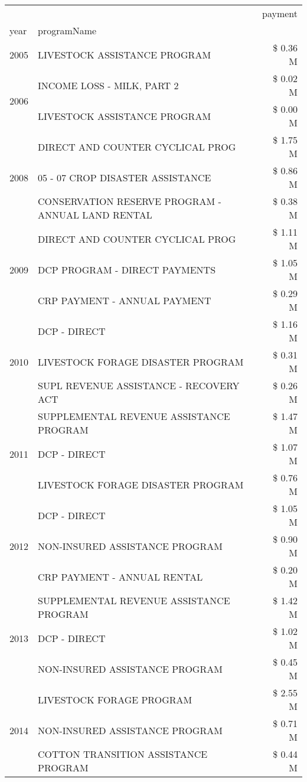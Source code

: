 \begin{tabular}{llr}
\toprule
 &  & payment \\
year & programName &  \\
\midrule
2005 & LIVESTOCK ASSISTANCE PROGRAM & \$ 0.36 M \\
\cline{1-3}
\multirow[t]{2}{*}{2006} & INCOME LOSS - MILK, PART 2 & \$ 0.02 M \\
 & LIVESTOCK ASSISTANCE PROGRAM & \$ 0.00 M \\
\cline{1-3}
\multirow[t]{3}{*}{2008} & DIRECT AND COUNTER CYCLICAL PROG & \$ 1.75 M \\
 & 05 - 07 CROP DISASTER ASSISTANCE & \$ 0.86 M \\
 & CONSERVATION RESERVE PROGRAM - ANNUAL LAND RENTAL & \$ 0.38 M \\
\cline{1-3}
\multirow[t]{3}{*}{2009} & DIRECT AND COUNTER CYCLICAL PROG & \$ 1.11 M \\
 & DCP PROGRAM - DIRECT PAYMENTS & \$ 1.05 M \\
 & CRP PAYMENT - ANNUAL PAYMENT & \$ 0.29 M \\
\cline{1-3}
\multirow[t]{3}{*}{2010} & DCP - DIRECT & \$ 1.16 M \\
 & LIVESTOCK FORAGE DISASTER PROGRAM & \$ 0.31 M \\
 & SUPL REVENUE ASSISTANCE - RECOVERY ACT & \$ 0.26 M \\
\cline{1-3}
\multirow[t]{3}{*}{2011} & SUPPLEMENTAL REVENUE ASSISTANCE PROGRAM & \$ 1.47 M \\
 & DCP - DIRECT & \$ 1.07 M \\
 & LIVESTOCK FORAGE DISASTER PROGRAM & \$ 0.76 M \\
\cline{1-3}
\multirow[t]{3}{*}{2012} & DCP - DIRECT & \$ 1.05 M \\
 & NON-INSURED ASSISTANCE PROGRAM & \$ 0.90 M \\
 & CRP PAYMENT - ANNUAL RENTAL & \$ 0.20 M \\
\cline{1-3}
\multirow[t]{3}{*}{2013} & SUPPLEMENTAL REVENUE ASSISTANCE PROGRAM & \$ 1.42 M \\
 & DCP - DIRECT & \$ 1.02 M \\
 & NON-INSURED ASSISTANCE PROGRAM & \$ 0.45 M \\
\cline{1-3}
\multirow[t]{3}{*}{2014} & LIVESTOCK FORAGE PROGRAM & \$ 2.55 M \\
 & NON-INSURED ASSISTANCE PROGRAM & \$ 0.71 M \\
 & COTTON TRANSITION ASSISTANCE PROGRAM & \$ 0.44 M \\

\end{tabular}
